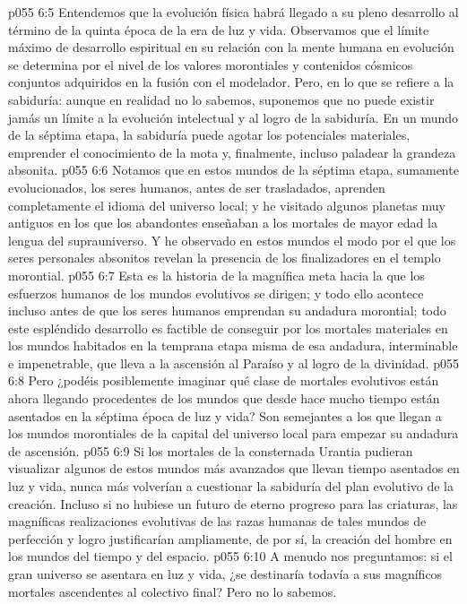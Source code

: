 \vs p055 6:5 Entendemos que la evolución física habrá llegado a su pleno desarrollo al término de la quinta época de la era de luz y vida. Observamos que el límite máximo de desarrollo espiritual en su relación con la mente humana en evolución se determina por el nivel de los valores morontiales y contenidos cósmicos conjuntos adquiridos en la fusión con el modelador. Pero, en lo que se refiere a la sabiduría: aunque en realidad no lo sabemos, suponemos que no puede existir jamás un límite a la evolución intelectual y al logro de la sabiduría. En un mundo de la séptima etapa, la sabiduría puede agotar los potenciales materiales, emprender el conocimiento de la mota y, finalmente, incluso paladear la grandeza absonita.
\vs p055 6:6 Notamos que en estos mundos de la séptima etapa, sumamente evolucionados, los seres humanos, antes de ser trasladados, aprenden completamente el idioma del universo local; y he visitado algunos planetas muy antiguos en los que los abandontes enseñaban a los mortales de mayor edad la lengua del suprauniverso. Y he observado en estos mundos el modo por el que los seres personales absonitos revelan la presencia de los finalizadores en el templo morontial.
\vs p055 6:7 \pc Esta es la historia de la magnífica meta hacia la que los esfuerzos humanos de los mundos evolutivos se dirigen; y todo ello acontece incluso antes de que los seres humanos emprendan su andadura morontial; todo este espléndido desarrollo es factible de conseguir por los mortales materiales en los mundos habitados en la temprana etapa misma de esa andadura, interminable e impenetrable, que lleva a la ascensión al Paraíso y al logro de la divinidad.
\vs p055 6:8 Pero ¿podéis posiblemente imaginar qué clase de mortales evolutivos están ahora llegando procedentes de los mundos que desde hace mucho tiempo están asentados en la séptima época de luz y vida? Son semejantes a los que llegan a los mundos morontiales de la capital del universo local para empezar su andadura de ascensión.
\vs p055 6:9 Si los mortales de la consternada Urantia pudieran visualizar algunos de estos mundos más avanzados que llevan tiempo asentados en luz y vida, nunca más volverían a cuestionar la sabiduría del plan evolutivo de la creación. Incluso si no hubiese un futuro de eterno progreso para las criaturas, las magníficas realizaciones evolutivas de las razas humanas de tales mundos de perfección y logro justificarían ampliamente, de por sí, la creación del hombre en los mundos del tiempo y del espacio.
\vs p055 6:10 A menudo nos preguntamos: si el gran universo se asentara en luz y vida, ¿se destinaría todavía a sus magníficos mortales ascendentes al colectivo final? Pero no lo sabemos.

